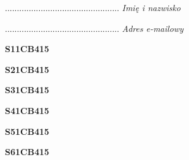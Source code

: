 \begin{turn}{90}\begin{minipage}{\linewidth} \vspace{20mm} ................................................  \textit{Imię i nazwisko}\end{minipage}\end{turn}

\begin{turn}{90}\begin{minipage}{\linewidth} \vspace{20mm} ................................................  \textit{Adres e-mailowy}\end{minipage}\end{turn}

\begin{turn}{90}\huge \begin{minipage}{\linewidth} \vspace{10mm}\textbf{S11CB415}\end{minipage}\end{turn}

\begin{turn}{90}\huge \begin{minipage}{\linewidth} \vspace{10mm}\textbf{S21CB415}\end{minipage}\end{turn}

\begin{turn}{90}\huge \begin{minipage}{\linewidth} \vspace{10mm}\textbf{S31CB415}\end{minipage}\end{turn}

\begin{turn}{90}\huge \begin{minipage}{\linewidth} \vspace{10mm}\textbf{S41CB415}\end{minipage}\end{turn}

\begin{turn}{90}\huge \begin{minipage}{\linewidth} \vspace{10mm}\textbf{S51CB415}\end{minipage}\end{turn}

\begin{turn}{90}\huge \begin{minipage}{\linewidth} \vspace{10mm}\textbf{S61CB415}\end{minipage}\end{turn}

